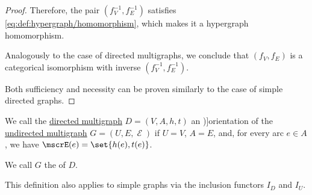 \begin{proof}
  Therefore, the pair \( (f_V^{-1}, f_E^{-1}) \) satisfies \eqref{eq:def:hypergraph/homomorphism}, which makes it a hypergraph homomorphism.

  Analogously to the case of directed multigraphs, we conclude that \( (f_V, f_E) \) is a categorical isomorphism with inverse \( (f_V^{-1}, f_E^{-1}) \).

   Both sufficiency and necessity can be proven similarly to the case of simple directed graphs.
\end{proof}

\begin{definition}\label{def:multigraph_orientation}
  We call the \hyperref[def:directed_multigraph]{directed multigraph} \( D = (V, A, h, t) \) an \term[ru=ориентация (\cite[32]{ЕмеличевИПр1990ТеорияГрафов})]{orientation} of the \hyperref[def:hypergraph/multigraph]{undirected multigraph} \( G = (U, E, \mscrE) \) if \( U = V \), \( A = E \), and, for every arc \( e \in A \), we have \( \mscrE(e) = \set{ h(e), t(e) } \).

  We call \( G \) the  of \( D \).
\end{definition}
\begin{comments}
  \item This definition also applies to simple graphs via the inclusion functors \hyperref[def:graph_functors/directed_inclusion]{\( I_D \)} and \hyperref[def:graph_functors/undirected_inclusion]{\( I_U \)}.
\end{comments}

